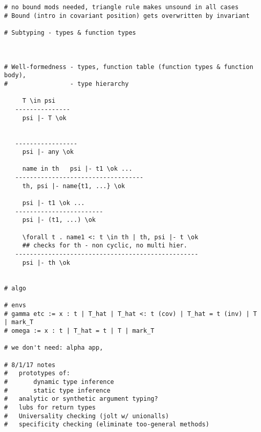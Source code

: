 \documentclass{report} %
\begin{document}
\begin{verbatim}
# no bound mods needed, triangle rule makes unsound in all cases
# Bound (intro in covariant position) gets overwritten by invariant

# Subtyping - types & function types



# Well-formedness - types, function table (function types & function body),
#                 - type hierarchy

     T \in psi
   ---------------
     psi |- T \ok

     
   -----------------
     psi |- any \ok

     name in th   psi |- t1 \ok ...
   -----------------------------------
     th, psi |- name{t1, ...} \ok

     psi |- t1 \ok ...
   ------------------------
     psi |- (t1, ...) \ok 

     \forall t . name1 <: t \in th | th, psi |- t \ok 
     ## checks for th - non cyclic, no multi hier.
   --------------------------------------------------
     psi |- th \ok 


# algo

# envs
# gamma etc := x : t | T_hat | T_hat <: t (cov) | T_hat = t (inv) | T | mark_T 
# omega := x : t | T_hat = t | T | mark_T

# we don't need: alpha app, 

# 8/1/17 notes
#   prototypes of:
#       dynamic type inference
#       static type inference
#   analytic or synthetic argument typing?
#   lubs for return types
#   Universality checking (jolt w/ unionalls) 
#   specificity checking (eliminate too-general methods)

\end{verbatim}
\end{document}
